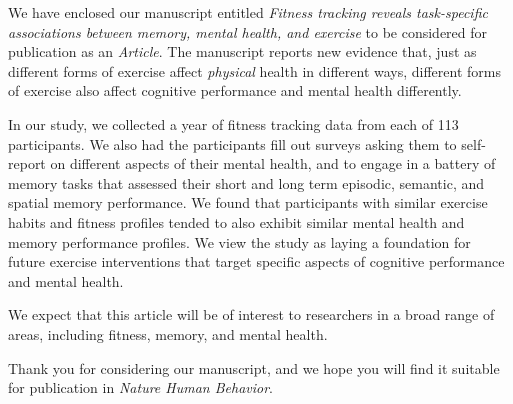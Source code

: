 \documentclass[11pt,stdletter,orderfromtodate,sigleft]{newlfm}
\begin{document}
\begin{newlfm}
We have enclosed our manuscript entitled \textit{Fitness tracking
  reveals task-specific associations between memory, mental health,
  and exercise} to be considered for publication as an
\textit{Article}.  The manuscript reports new evidence that, just as different
forms of exercise affect \textit{physical} health in different ways,
different forms of exercise also affect cognitive performance and
mental health differently.

In our study, we collected a year of fitness tracking data from each
of 113 participants.  We also had the participants fill out surveys
asking them to self-report on different aspects of their mental
health, and to engage in a battery of memory tasks that assessed their
short and long term episodic, semantic, and spatial memory
performance.  We found that participants with similar exercise habits
and fitness profiles tended to also exhibit similar mental health and
memory performance profiles.  We view the study as laying a foundation
for future exercise interventions that target specific aspects of
cognitive performance and mental health.


We expect that this article will be of interest to researchers in a
broad range of areas, including fitness, memory, and mental health.

Thank you for considering our manuscript, and we hope you will find it
suitable for publication in \textit{Nature Human Behavior}.


\end{newlfm}
\end{document}
